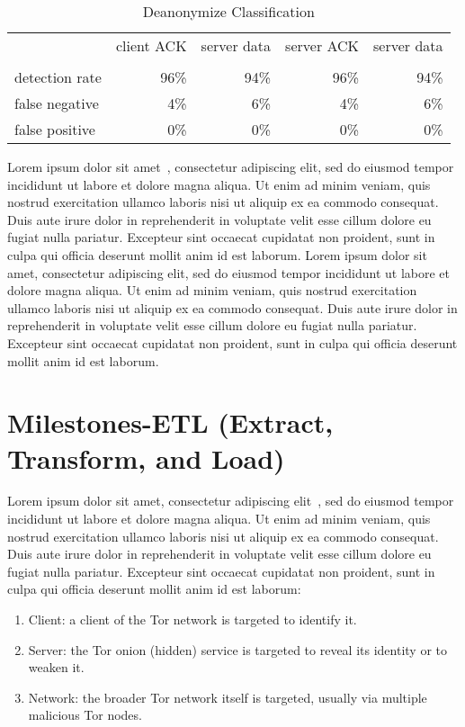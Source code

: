 \documentclass[letterpaper, 10 pt, conference]{ieeeconf}  %
\begin{document}
\begin{center}
\begin{table}[ht]
	\caption{Deanonymize Classification}
	\centering
	\begin{tabular}{l r r r r}
		\hline\hline
		\ \ & client  ACK & server data & server ACK & server data \\\\ [0.5ex] 
		\hline
		detection rate&96\%&94\%&96\%&94\% \\
		false negative&4\%&6\%&4\%&6\% \\
		false positive&0\%&0\%&0\% &0\% \\ [1ex]
		\hline
	\end{tabular}
	\label{table:nonlin}
\end{table}
\end{center} 

Lorem ipsum dolor sit amet~\cite{Cite11}, consectetur adipiscing elit, sed do eiusmod tempor incididunt ut labore et dolore magna aliqua. Ut enim ad minim veniam, quis nostrud exercitation ullamco laboris nisi ut aliquip ex ea commodo consequat. Duis aute irure dolor in reprehenderit in voluptate velit esse cillum dolore eu fugiat nulla pariatur. Excepteur sint occaecat cupidatat non proident, sunt in culpa qui officia deserunt mollit anim id est laborum. Lorem ipsum dolor sit amet, consectetur adipiscing elit, sed do eiusmod tempor incididunt ut labore et dolore magna aliqua. Ut enim ad minim veniam, quis nostrud exercitation ullamco laboris nisi ut aliquip ex ea commodo consequat. Duis aute irure dolor in reprehenderit in voluptate velit esse cillum dolore eu fugiat nulla pariatur. Excepteur sint occaecat cupidatat non proident, sunt in culpa qui officia deserunt mollit anim id est laborum.

\section{Milestones-ETL (Extract, Transform, and Load)}

Lorem ipsum dolor sit amet, consectetur adipiscing elit~\cite{Cite12}, sed do eiusmod tempor incididunt ut labore et dolore magna aliqua. Ut enim ad minim veniam, quis nostrud exercitation ullamco laboris nisi ut aliquip ex ea commodo consequat. Duis aute irure dolor in reprehenderit in voluptate velit esse cillum dolore eu fugiat nulla pariatur. Excepteur sint occaecat cupidatat non proident, sunt in culpa qui officia deserunt mollit anim id est laborum:

\begin{enumerate}
	\item Client: a client of the Tor network is targeted to identify it.
	\item Server: the Tor onion (hidden) service is targeted to reveal its identity or to weaken it.
	\item Network: the broader Tor network itself is targeted, usually via multiple malicious Tor nodes.
\end{enumerate}
\end{document}
